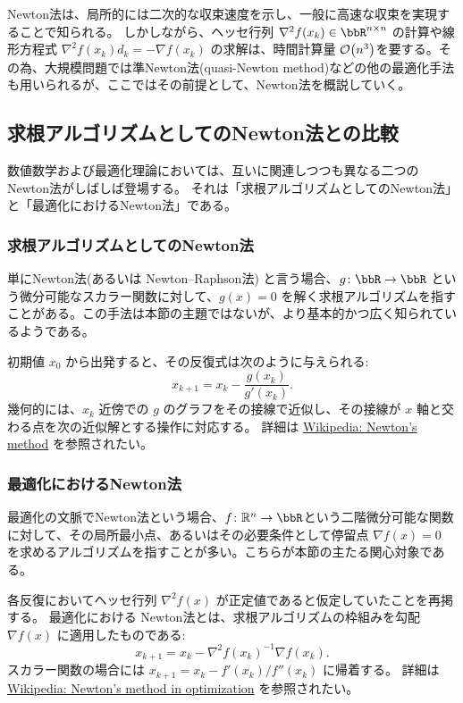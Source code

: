 \documentclass[a4paper, 10pt, dvipdfmx,draft]{article}
\begin{document}
Newton法は、局所的には二次的な収束速度を示し、一般に高速な収束を実現することで知られる。
しかしながら、ヘッセ行列 $\nabla^2 f(x_k) \in \bbR^{n \times n}$ の計算や線形方程式 $\nabla^2 f(x_k) d_k = -\nabla f(x_k)$ の求解は、時間計算量 $\order{n^3}$を要する。その為、大規模問題では準Newton法(quasi-Newton method)などの他の最適化手法も用いられるが、ここではその前提として、Newton法を概説していく。

\subsection{求根アルゴリズムとしてのNewton法との比較}

数値数学および最適化理論においては、互いに関連しつつも異なる二つの Newton法がしばしば登場する。
それは「求根アルゴリズムとしてのNewton法」と「最適化におけるNewton法」である。

\subsubsection{求根アルゴリズムとしてのNewton法}

単にNewton法(あるいは Newton--Raphson法) と言う場合、$g\colon \bbR \to \bbR$ という微分可能なスカラー関数に対して、$g(x) = 0$ を解く求根アルゴリズムを指すことがある。この手法は本節の主題ではないが、より基本的かつ広く知られているようである。

初期値 $x_0$ から出発すると、その反復式は次のように与えられる:
\begin{equation*}
    x_{k+1} = x_k - \frac{g(x_k)}{g'(x_k)}.
\end{equation*}
幾何的には、$x_k$ 近傍での $g$ のグラフをその接線で近似し、その接線が $x$ 軸と交わる点を次の近似解とする操作に対応する。
詳細は \href{https://en.wikipedia.org/wiki/Newton%27s_method}{Wikipedia: Newton's method} を参照されたい。

\subsubsection{最適化におけるNewton法}

最適化の文脈でNewton法という場合、$f\colon \mathbb R^{n} \to\bbR$という二階微分可能な関数に対して、その局所最小点、あるいはその必要条件として停留点 $\nabla f(x) = 0$ を求めるアルゴリズムを指すことが多い。こちらが本節の主たる関心対象である。

各反復においてヘッセ行列 $\nabla^2 f(x)$ が正定値であると仮定していたことを再掲する。
最適化における Newton法とは、求根アルゴリズムの枠組みを勾配 $\nabla f(x)$ に適用したものである:
\begin{equation*}
    x_{k+1} = x_k - \nabla^2 f(x_k)^{-1} \nabla f(x_k).
\end{equation*}
スカラー関数の場合には $x_{k+1}=x_k - f'(x_k) / f''(x_k)$ に帰着する。
詳細は \href{https://en.wikipedia.org/wiki/Newton%27s_method_in_optimization}{Wikipedia: Newton's method in optimization} を参照されたい。
\end{document}
